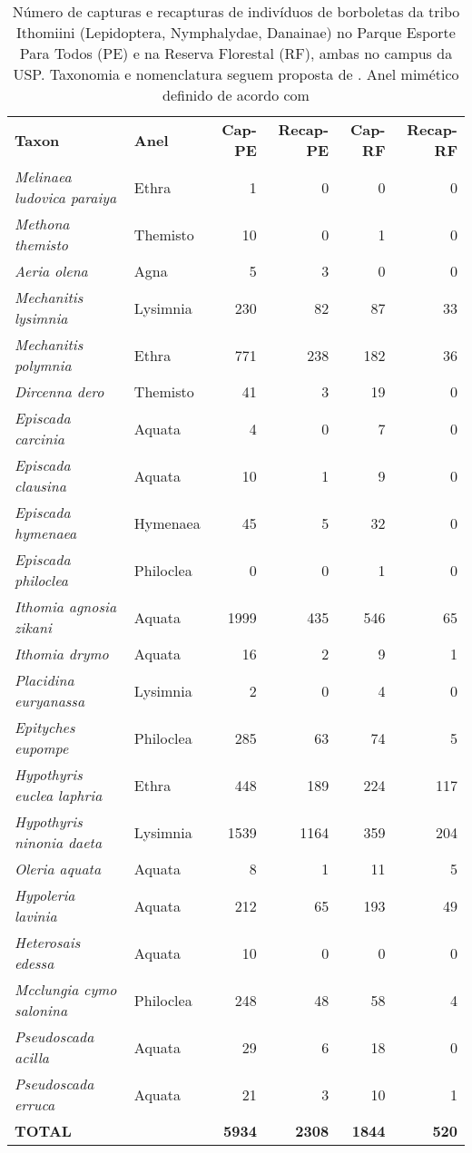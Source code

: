 \begin{table}
\caption{\label{tab:borb1} Número de capturas e recapturas de indivíduos 
de borboletas da tribo
Ithomiini (Lepidoptera, Nymphalydae, Danainae) no Parque
Esporte Para Todos (PE) e na Reserva Florestal (RF), ambas no campus da
USP. Taxonomia e nomenclatura seguem proposta de \citet{Brower_2014}. 
Anel mimético definido de acordo com \citet{Willmott_2004}}
\begin{tabular}{llrrrr}
  \textbf{Taxon} & \textbf{Anel} & \textbf{Cap-PE} & \textbf{Recap-PE} & \textbf{Cap-RF} & \textbf{Recap-RF}\\
 \emph{ Melinaea ludovica paraiya} & Ethra & 1 & 0 & 0 & 0\\
  \emph{Methona themisto} & Themisto & 10 & 0 & 1 & 0\\
  \emph{Aeria olena} & Agna & 5 & 3 & 0 & 0\\
  \emph{Mechanitis lysimnia} & Lysimnia & 230 & 82 & 87 & 33\\
  \emph{Mechanitis polymnia} & Ethra & 771 & 238 & 182 & 36\\
  \emph{Dircenna dero} & Themisto & 41 & 3 & 19 & 0\\
  \emph{Episcada carcinia} & Aquata & 4 & 0 & 7 & 0\\
  \emph{Episcada clausina} & Aquata & 10 & 1 & 9 & 0\\
  \emph{Episcada hymenaea} & Hymenaea & 45 & 5 & 32 & 0\\
  \emph{Episcada philoclea} & Philoclea & 0 & 0 & 1 & 0\\
  \emph{Ithomia agnosia zikani} & Aquata & 1999 & 435 & 546 & 65\\
  \emph{Ithomia drymo} & Aquata & 16 & 2 & 9 & 1\\
  \emph{Placidina euryanassa} & Lysimnia & 2 & 0 & 4 & 0\\
  \emph{Epityches eupompe} & Philoclea & 285 & 63 & 74 & 5\\
  \emph{Hypothyris euclea laphria} & Ethra & 448 & 189 & 224 & 117\\
  \emph{Hypothyris ninonia daeta} & Lysimnia & 1539 & 1164 & 359 & 204\\
  \emph{Oleria aquata} & Aquata & 8 & 1 & 11 & 5\\
  \emph{Hypoleria lavinia} & Aquata & 212 & 65 & 193 & 49\\
  \emph{Heterosais edessa} & Aquata & 10 & 0 & 0 & 0\\
  \emph{Mcclungia cymo salonina} & Philoclea & 248 & 48 & 58 & 4\\
  \emph{Pseudoscada acilla} & Aquata & 29 & 6 & 18 & 0\\
  \emph{Pseudoscada erruca} & Aquata & 21 & 3 & 10 & 1\\
  \textbf{TOTAL} & & \textbf{5934} & \textbf{2308} & \textbf{1844} & \textbf{520}\\
\end{tabular} 
\end{table}